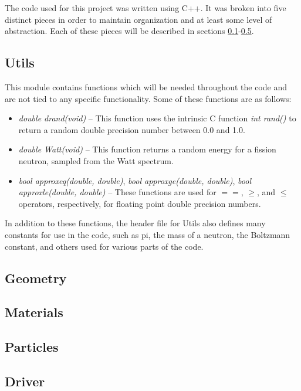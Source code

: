 The code used for this project was written using C++.  It was broken into five distinct pieces in order to maintain organization and at least some level of abstraction.  Each of these pieces will be described in sections \ref{ss:utils}-\ref{ss:driver}.

\subsection{Utils}\label{ss:utils}

This module contains functions which will be needed throughout the code and are not tied to any specific functionality.  Some of these functions are as follows:

\begin{itemize}
\item \textit{double drand(void)} -- This function uses the intrinsic C function \textit{int rand()} to return a random double precision number between 0.0 and 1.0.
\item \textit{double Watt(void)} -- This function returns a random energy for a fission neutron, sampled from the Watt spectrum.
\item \textit{bool approxeq(double, double)}, \textit{bool approxge(double, double)}, \textit{bool approxle(double, double)} -- These functions are used for $==$, $\ge$, and $\le$ operators, respectively, for floating point double precision numbers.
\end{itemize}

In addition to these functions, the header file for Utils also defines many constants for use in the code, such as pi, the mass of a neutron, the Boltzmann constant, and others used for various parts of the code.

\subsection{Geometry}\label{ss:geometry}



\subsection{Materials}\label{ss:materials}



\subsection{Particles}\label{ss:particles}



\subsection{Driver}\label{ss:driver}



